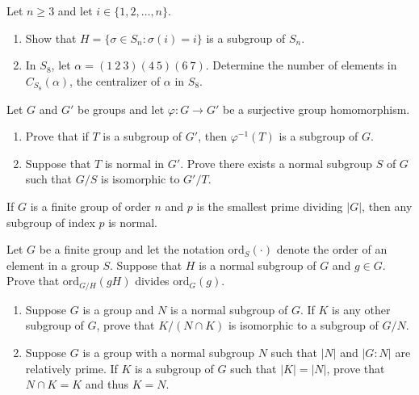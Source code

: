 \documentclass[a4paper]{article}
\begin{document}
\begin{problem}[Spring 2025]
   Let \( n \geq 3   \) and let \( i \in \{  1,2,\dots, n \}  \). 
   \begin{enumerate}
       \item[(a)] Show that \( H = \{ \sigma \in {S}_{n} : \sigma(i) = i    \}   \) is a subgroup of \( {S}_{n} \). 
        \item[(b)] In \( {S}_{8} \), let \( \alpha = (1 \ 2 \ 3)(4 \ 5)(6 \ 7) \). Determine the number of elements in \( {C}_{{S}_{8}}(\alpha) \), the centralizer of \( \alpha  \) in \( {S}_{8} \).
   \end{enumerate}
\end{problem}

\begin{problem}[Fall 2024]
   Let \( G  \) and \( G' \) be groups and let \( \varphi : G \to G' \) be a surjective group homomorphism. 
   \begin{enumerate}
       \item[(a)] Prove that if \( T  \) is a subgroup of \( G' \), then \( \varphi^{-1}(T) \) is a subgroup of \( G \).
        \item[(b)] Suppose that \( T  \) is normal in \( G' \). Prove there exists a normal subgroup \( S \) of \( G  \) such that \( G / S  \) is isomorphic to \( G' /T  \).
   \end{enumerate}
\end{problem}

\begin{problem}[Fall 2024]
        If \( G  \) is a finite group of order \( n  \) and \( p  \) is the smallest prime dividing \( | G  |  \), then any subgroup of index \( p  \) is normal.
\end{problem}

\begin{problem}[Fall 2024]
    Let \( G  \) be a finite group and let the notation \( \text{ord}_S(\cdot) \) denote the order of an element in a group \( S \).
        Suppose that \( H  \) is a normal subgroup of \( G  \) and \( g \in G  \). Prove that \( \text{ord}_{G/H}(gH) \) divides \( \text{ord}_{G}(g) \).
\end{problem}

\begin{problem}[Fall 2023]
    \begin{enumerate}
        \item[(a)] Suppose \( G  \) is a group and \( N  \) is a normal subgroup of \( G  \). If \( K  \) is any other subgroup of \( G  \), prove that \( K / (N \cap K)  \) is isomorphic to a subgroup of \( G / N  \).
        \item[(b)] Suppose \( G  \) is a group with a normal subgroup \( N \) such that \( | N  |   \) and \( | G : N |  \) are relatively prime. If \( K  \) is a subgroup of \( G  \) such that \( | K  |  = | N  |  \), prove that \( N \cap K = K  \) and thus \( K =  N  \).
    \end{enumerate}
\end{problem}
\end{document}
